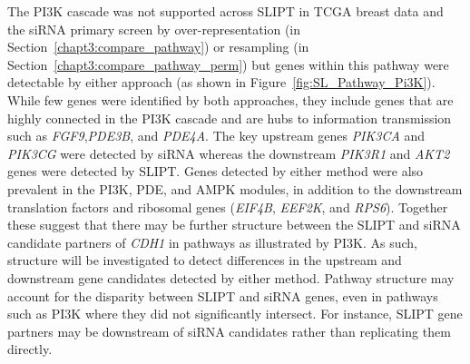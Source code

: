 \begin{figure*}[!tb]
  \begin{center}
   }
   \end{center}
   \caption[Synthetic lethality in the PI3K cascade]{\small \textbf{Synthetic lethality in the PI3K cascade.} The Reactome PI3K Cascade \gls{pathway} with \gls{synthetic lethal} candidates coloured as shown in the legend.
}
\label{fig:SL_Pathway_Pi3K}
\end{figure*}

The PI3K cascade was not supported across \gls{SLIPT} in \gls{TCGA} breast  data and the \gls{siRNA} primary screen by over-representation (in Section~\ref{chapt3:compare_pathway}) or resampling (in Section~\ref{chapt3:compare_pathway_perm}) but genes within this \gls{pathway} were detectable by either approach (as shown in Figure~\ref{fig:SL_Pathway_Pi3K}).  While few genes were identified by both approaches, they include genes that are highly connected in the PI3K cascade and are hubs to information transmission such as \textit{FGF9},\textit{PDE3B}, and \textit{PDE4A}. The key upstream genes \textit{PIK3CA} and \textit{PIK3CG} were detected by \gls{siRNA} whereas the downstream \textit{PIK3R1} and \textit{AKT2} genes were detected by \gls{SLIPT}. Genes detected by either method were also prevalent in the PI3K, PDE, and AMPK modules, in addition to the downstream translation factors and ribosomal genes (\textit{EIF4B}, \textit{EEF2K}, and \textit{RPS6}). Together these suggest that there may be further structure between the \gls{SLIPT} and \gls{siRNA} candidate partners of \textit{CDH1} in \glspl{pathway} as illustrated by PI3K. As such,  structure will be investigated to detect differences in the upstream and downstream gene candidates detected by either method. Pathway structure may account for the disparity between \gls{SLIPT} and \gls{siRNA} genes, even in \glspl{pathway} such as PI3K where they did not significantly intersect. For instance, \gls{SLIPT} gene partners may be downstream of \gls{siRNA} candidates rather than replicating them directly.

